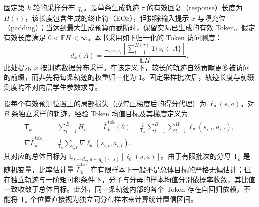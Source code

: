 \documentclass[lang=cn,scheme=chinese,openany]{elegantbook}
\begin{document}
固定第 $k$ 轮的采样分布 $q_k$。设单条生成轨迹 $\tau$ 的有效回复（response）长度为 $H(\tau)$，该长度包含生成的终止符（EOS），但排除输入提示 $x$ 与填充位（padding）；当达到最大生成预算而截断时，保留实际已生成的有效 Token。假定有效长度满足 $0<\mathbb E H<\infty$。本书采用如下归一化的 Token 访问测度：
\begin{equation}
 d_k(A)=\frac{\mathbb E_{\tau\sim q_k}
 \left[\sum_{t=1}^{H(\tau)}\mathbf1\{s_t\in A\}\right]}{\mathbb E H}.
\end{equation}
此处提示 $x$ 按训练数据分布采样。在该定义下，较长的轨迹自然贡献更多被访问的前缀，而非先将每条轨迹的权重归一化为 $1$。固定采样批次后，轨迹长度与前缀测度均不对内层学生参数求导。

设每个有效预测位置上的局部损失（或停止梯度后的得分代理）为 $\ell_\theta(s,a)$。对 $B$ 条独立采样的轨迹，经验 Token 均值目标及其梯度定义为
\begin{align}
 \mathsf T_k&=\sum_{i=1}^{B}H_i,\qquad
 \widehat L_k^{\mathrm{tok}}(\theta)
 =\frac1{\mathsf T_k}\sum_{i=1}^{B}\sum_{t=1}^{H_i}
 \ell_\theta(s_{i,t},a_{i,t}),\\
 \nabla\widehat L_k^{\mathrm{tok}}
 &=\frac1{\mathsf T_k}\sum_{i,t}\nabla\ell_\theta(s_{i,t},a_{i,t}).
\end{align}
其对应的总体目标为 $\mathbb E_{s\sim d_k,\, a\sim q_k(\cdot\mid s)}[\ell_\theta(s,a)]$。由于有限批次的分母 $\mathsf T_k$ 是随机变量，比率估计量 $\widehat L_k^{\mathrm{tok}}$ 在有限样本下一般不是总体目标的严格无偏估计；但在独立轨迹与一阶矩可积条件下，分子与分母的样本均值分别依概率收敛，其比值一致收敛于总体目标。此外，同一条轨迹内部的各个 Token 存在自回归依赖，不能将 $\mathsf T_k$ 个位置直接视为独立同分布样本来计算统计置信区间。
\end{document}

